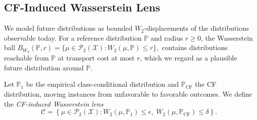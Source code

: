 \subsection{CF-Induced Wasserstein Lens}\label{sec:lens}

We model future distributions as bounded $W_2$-displacements of the distributions observable today. %
For a reference distribution $\mathbb{P}$ and radius $r\geq0$, the Wasserstein ball \(B_{W_2}(\mathbb P,r)=\{\mu\in\mathcal P_2(\mathcal X): W_2(\mu,\mathbb P)\le r\},\) contains distributions reachable from $\mathbb{P}$ at transport cost at most $r$, which we regard as a plausible future distribution around $\mathbb{P}$.

\begin{definition}
\label{def:feasible}
Let $\mathbb P_1$ be the empirical class-conditional distribution and $\mathbb P_{\mathrm{CF}}$ the CF distribution, moving instances from unfavorable to favorable outcomes. 
We define the \emph{CF-induced Wasserstein lens}
\begin{equation}\label{eq:cf-inducedlens}
  \mathcal C
=
\left\{
\mu\in \mathcal{P}_2(\mathcal X):
W_2(\mu,\mathbb{P}_1)\le\epsilon,\;
W_2(\mu,\mathbb{P}_{\mathrm{CF}})\le\delta
\right\}.  
\end{equation}
\end{definition}


